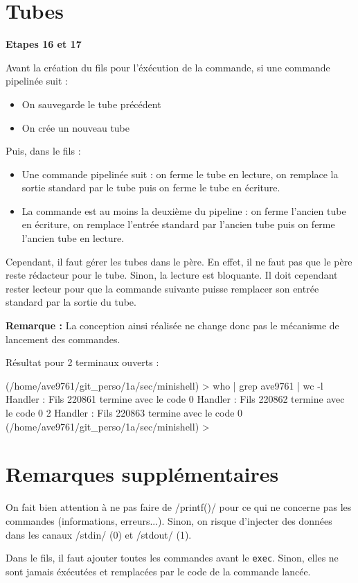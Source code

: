 \documentclass[a4paper, 12pt]{article}
\begin{document}
\part{Tubes}

\noindent
\textbf{Etapes 16 et 17}

\bigskip
Avant la création du fils pour l'éxécution de la commande, si une commande pipelinée suit :
\begin{itemize}
	\item On sauvegarde le tube précédent
	\item On crée un nouveau tube
\end{itemize}

Puis, dans le fils :
\begin{itemize}
	\item Une commande pipelinée suit : on ferme le tube en lecture, on remplace la sortie standard par le tube puis on ferme le tube en écriture.
	\item La commande est au moins la deuxième du pipeline : on ferme l'ancien tube en écriture, on remplace l'entrée standard par l'ancien tube puis on ferme l'ancien tube en lecture.
\end{itemize}

Cependant, il faut gérer les tubes dans le père. En effet, il ne faut pas que le père reste rédacteur pour le tube. Sinon, la lecture est bloquante. Il doit cependant rester lecteur pour que la commande suivante puisse remplacer son entrée standard par la sortie du tube.

\bigskip
\textbf{Remarque : }
La conception ainsi réalisée ne change donc pas le mécanisme de lancement des commandes.

\bigskip
Résultat pour 2 terminaux ouverts :
\begin{bashcode}
(/home/ave9761/git_perso/1a/sec/minishell) > who | grep ave9761 | wc -l
Handler : Fils 220861 termine avec le code 0
Handler : Fils 220862 termine avec le code 0
2
Handler : Fils 220863 termine avec le code 0
(/home/ave9761/git_perso/1a/sec/minishell) >
\end{bashcode}

\part{Remarques supplémentaires}

On fait bien attention à ne pas faire de \cinline/printf()/ pour ce qui ne concerne pas les commandes (informations, erreurs...).
Sinon, on risque d'injecter des données dans les canaux \cinline/stdin/ (0) et \cinline/stdout/ (1).

\bigskip
Dans le fils, il faut ajouter toutes les commandes avant le \texttt{exec}. Sinon, elles ne sont jamais éxécutées et remplacées par le code de la commande lancée.
\end{document}
